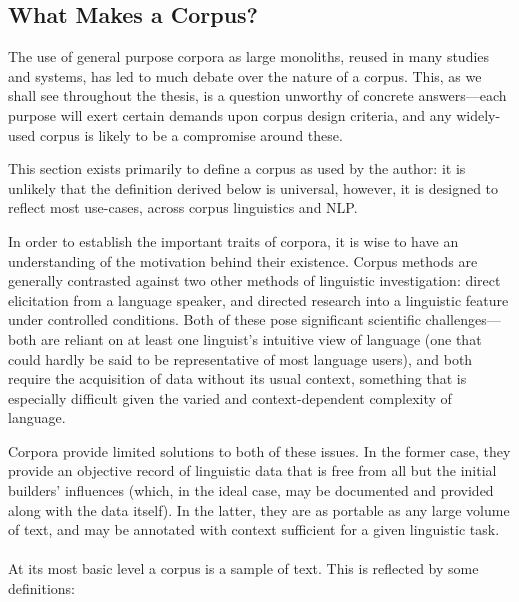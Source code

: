 \subsection{What Makes a Corpus?}
The use of general purpose corpora as large monoliths, reused in many studies and systems, has led to much debate over the nature of a corpus.  This, as we shall see throughout the thesis, is a question unworthy of concrete answers---each purpose will exert certain demands upon corpus design criteria, and any widely-used corpus is likely to be a compromise around these.

This section exists primarily to define a corpus as used by the author: it is unlikely that the definition derived below is universal, however, it is designed to reflect most use-cases, across corpus linguistics and NLP.




In order to establish the important traits of corpora, it is wise to have an understanding of the motivation behind their existence.  Corpus methods are generally contrasted against two other methods of linguistic investigation: direct elicitation from a language speaker, and directed research into a linguistic feature under controlled conditions.  Both of these pose significant scientific challenges---both are reliant on at least one linguist's intuitive view of language (one that could hardly be said to be representative of most language users), and both require the acquisition of data without its usual context, something that is especially difficult given the varied and context-dependent complexity of language.

Corpora provide limited solutions to both of these issues.  In the former case, they provide an objective record of linguistic data that is free from all but the initial builders' influences (which, in the ideal case, may be documented and provided along with the data itself).  In the latter, they are as portable as any large volume of text, and may be annotated with context sufficient for a given linguistic task.


\paragraph{}
At its most basic level a corpus is a sample of text.  This is reflected by some definitions:

